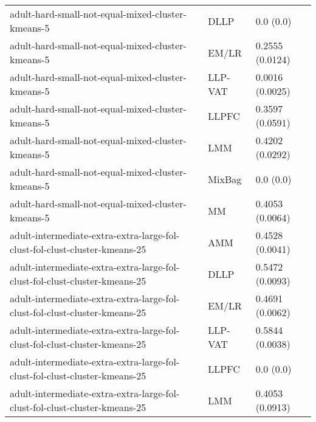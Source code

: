 \begin{longtable}{lll}
                                                            adult-hard-small-not-equal-mixed-cluster-kmeans-5 &      DLLP &                                 0.0 (0.0) \\
                                                            adult-hard-small-not-equal-mixed-cluster-kmeans-5 &     EM/LR &                           0.2555 (0.0124) \\
                                                            adult-hard-small-not-equal-mixed-cluster-kmeans-5 &   LLP-VAT &                           0.0016 (0.0025) \\
                                                            adult-hard-small-not-equal-mixed-cluster-kmeans-5 &     LLPFC &                           0.3597 (0.0591) \\
                                                            adult-hard-small-not-equal-mixed-cluster-kmeans-5 &       LMM &                           0.4202 (0.0292) \\
                                                            adult-hard-small-not-equal-mixed-cluster-kmeans-5 &    MixBag &                                 0.0 (0.0) \\
                                                            adult-hard-small-not-equal-mixed-cluster-kmeans-5 &        MM &                           0.4053 (0.0064) \\
                                   adult-intermediate-extra-extra-large-fol-clust-fol-clust-cluster-kmeans-25 &       AMM &                           0.4528 (0.0041) \\
                                   adult-intermediate-extra-extra-large-fol-clust-fol-clust-cluster-kmeans-25 &      DLLP &                           0.5472 (0.0093) \\
                                   adult-intermediate-extra-extra-large-fol-clust-fol-clust-cluster-kmeans-25 &     EM/LR &                           0.4691 (0.0062) \\
                                   adult-intermediate-extra-extra-large-fol-clust-fol-clust-cluster-kmeans-25 &   LLP-VAT &                           0.5844 (0.0038) \\
                                   adult-intermediate-extra-extra-large-fol-clust-fol-clust-cluster-kmeans-25 &     LLPFC &                                 0.0 (0.0) \\
                                   adult-intermediate-extra-extra-large-fol-clust-fol-clust-cluster-kmeans-25 &       LMM &                           0.4053 (0.0913) \\

\end{longtable}
